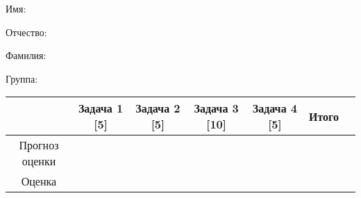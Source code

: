 \documentclass[11pt, openany]{book}
\numberwithin{equation}{page} %
\theoremstyle{definition} %
\theoremstyle{definition}
\theoremstyle{definition}
\begin{document}
\begin{large}
Имя:
\end{large}

\vspace{4pt}

\begin{large}
Отчество:
\end{large}

\vspace{4pt}

\begin{large}
Фамилия:
\end{large}

\vspace{4pt}

\begin{large}
Группа:
\end{large}

\vspace{4pt}

\begin{tabular}{|c|c|c|c|c|c|c|}
\hline  & Задача 1 [5] & Задача 2 [5] & Задача 3 [10] & Задача 4 [5] & Итого \\
\hline Прогноз оценки &  &  &  &  &   \\
\hline Оценка &  &  &  &  &   \\
\hline
\end{tabular}
\newpage
\end{document}
